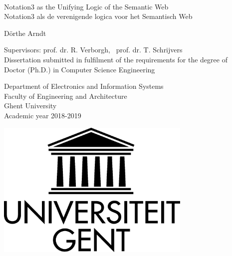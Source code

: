 
{\large \ \vspace{0.25\textheight} \\

\hspace{-\parindent}Notation3 as the Unifying Logic of the Semantic Web\\

\hspace{-\parindent}Notation3 als de verenigende logica voor het Semantisch Web


\vspace{0.5cm}
\hspace{-\parindent}D\"orthe Arndt

}

\vspace*{\fill}
\hspace{-\parindent}Supervisors: prof. dr. R. Verborgh,~ prof. dr. T. Schrijvers\\
\hspace{-\parindent}Dissertation submitted in fulfilment of the requirements for the degree of\\
\hspace{-\parindent}Doctor (Ph.D.) in Computer Science Engineering\\


\vspace{0.5cm}

\hspace{-\parindent}\begin{minipage}{0.7\textwidth}
  \hspace{-\parindent}Department of Electronics and Information Systems\\
  \hspace{-\parindent}Faculty of Engineering and Architecture\\
  \hspace{-\parindent}Ghent University\\
  \hspace{-\parindent}Academic year 2018-2019
\end{minipage}
\begin{minipage}{0.3\textwidth}
  \begin{flushright}
    \includegraphics[width=0.7\textwidth]{./figures/logo-ugent}
  \end{flushright}
\end{minipage}

